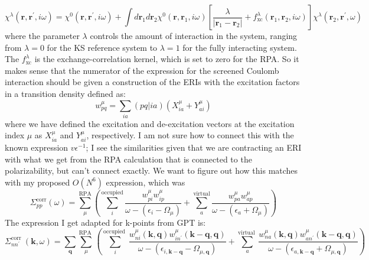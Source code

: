 \documentclass[12pt]{article}
\begin{document}
    \begin{equation}\label{eq:dyson}
        \chi^{\lambda}\left(\mathbf{r}, \mathbf{r}^{\prime}, i \omega\right) = \chi^{0}\left(\mathbf{r}, \mathbf{r}^{\prime}, i \omega\right) 
        + \int d \mathbf{r}_{1} d \mathbf{r}_{2} \chi^{0}\left(\mathbf{r}, \mathbf{r}_{1}, i \omega\right)\left[\frac{\lambda}{\left|\mathbf{r}_{1}-\mathbf{r}_{2}\right|}+f_{\mathrm{xc}}^{\lambda}\left(\mathbf{r}_{1}, \mathbf{r}_{2}, i \omega\right)\right] \chi^{\lambda}\left(\mathbf{r}_{2}, \mathbf{r}^{\prime}, \omega\right)
    \end{equation}
    where the parameter $\lambda$ controls the amount of interaction in the system, ranging from $\lambda = 0$ for the KS reference system to $\lambda = 1$ for the fully interacting system. The $f_{\mathrm{xc}}^{\lambda}$ is the exchange-correlation kernel, which is set to zero for the RPA. So it makes sense that the numerator of the expression for the screened Coulomb interaction should be given a construction of the ERIs with the excitation factors in a transition density defined as:
    \begin{equation}
        w_{pq}^{\mu} = \sum_{ia} (pq|ia) \left(X_{ia}^{\mu} + Y_{ai}^{\mu}\right)
    \end{equation}
    where we have defined the excitation and de-excitation vectors at the excitation index $\mu$ as $X_{ia}^{\mu}$ and $Y_{ai}^{\mu}$, respectively.
    I am not sure how to connect this with the known expression $v\epsilon ^{-1}$; I see the similarities given that we are contracting an ERI with what we get from the RPA calculation that is connected to the polarizability, but can't connect exactly.
    We want to figure out how this matches with my proposed $O(N^6)$ expression, which was
    \begin{equation}
        \Sigma_{pp}^{\text{corr}}(\omega) = \sum_{\mu }^{\text{RPA}}\left(\sum_{i}^{\text{occupied}} \frac{w_{pi}^{\mu }w_{ip}^{\mu }}{\omega -(\epsilon _{i}-\Omega  _{\mu })}+ \sum_{a}^{\text{virtual}} \frac{w_{pa}^{\mu }w_{ap}^{\mu }}{\omega -(\epsilon _{a}+\Omega  _{\mu })}\right)
    \end{equation}
    The expression I get adapted for k-points from GPT is:
    \begin{equation}
    \Sigma_{n n^\prime}^{\text {corr }}(\mathbf{k}, \omega)=\sum_{\mathbf{q}} \sum_\mu^{\text {RPA }}\left(\sum_i^{\text {occupied }} \frac{w_{n i}^\mu(\mathbf{k}, \mathbf{q}) w_{i n^\prime}^\mu(\mathbf{k}-\mathbf{q}, \mathbf{q})}{\omega-\left(\epsilon_{i, \mathbf{k}-\mathbf{q}}-\Omega_{\mu, \mathbf{q}}\right)}+\sum_a^{\text {virtual }} \frac{w_{n a}^\mu(\mathbf{k}, \mathbf{q}) w_{a n^\prime}^\mu(\mathbf{k}-\mathbf{q}, \mathbf{q})}{\omega-\left(\epsilon_{a, \mathbf{k}-\mathbf{q}}+\Omega_{\mu, \mathbf{q}}\right)}\right)
    \end{equation}
\end{document}
